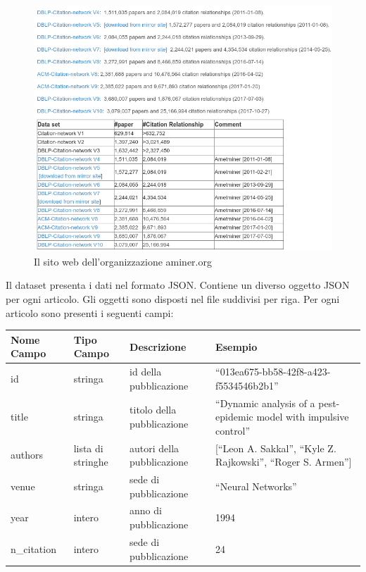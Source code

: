 \documentclass[a4paper, 12pt]{article}
\begin{document}
\begin{figure}[H]
  \includegraphics[width=\linewidth]{images/aminer.jpg}
  \caption{Il sito web dell'organizzazione aminer.org}
\end{figure}

Il dataset presenta i dati nel formato JSON. Contiene un diverso oggetto JSON per ogni articolo. Gli oggetti sono disposti nel file suddivisi per riga.
Per ogni articolo sono presenti i seguenti campi: \\
\begin{tabularx}{\textwidth}{| X | X | X | X |}
\hline \textbf{Nome Campo} & \textbf{Tipo Campo} & \textbf{Descrizione} & \textbf{Esempio} \\
\hline id & stringa & id della pubblicazione & ``013ea675-bb58-42f8-a423-f5534546b2b1''\\
\hline title & stringa & titolo della pubblicazione & ``Dynamic analysis of a pest-epidemic model with impulsive control'' \\
\hline authors & lista di stringhe & autori della pubblicazione & [``Leon A. Sakkal'', ``Kyle Z. Rajkowski'', ``Roger S. Armen'']\\
\hline venue & stringa & sede di pubblicazione & ``Neural Networks'' \\
\hline year & intero & anno di pubblicazione & 1994 \\
\hline n\_citation & intero & sede di pubblicazione & 24 \\
\hline
\end{tabularx}
\end{document}
